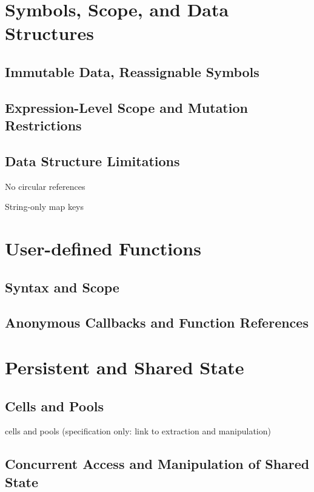 \documentclass{article}
\begin{document}
\pagebreak

\section{Symbols, Scope, and Data Structures}

\subsection{Immutable Data, Reassignable Symbols}

\subsection{Expression-Level Scope and Mutation Restrictions}

\subsection{Data Structure Limitations}

No circular references

String-only map keys

\pagebreak

\section{User-defined Functions}

\subsection{Syntax and Scope}

\subsection{Anonymous Callbacks and Function References}

\pagebreak

\section{Persistent and Shared State}

\subsection{Cells and Pools}

cells and pools (specification only: link to extraction and manipulation)

\subsection{Concurrent Access and Manipulation of Shared State}
\end{document}
